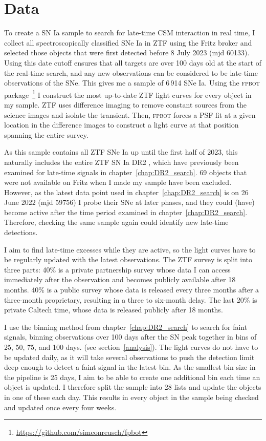\documentclass[a4paper,oneside,12pt, class=Latex/Classes/PhDthesisPSnPDF, crop=false]{standalone}
\begin{document}
\section{Data}
\label{data}
To create a SN Ia sample to search for late-time CSM interaction in real time, I collect all spectroscopically classified SNe Ia in ZTF using the Fritz broker \citep{skyportal2019, Skyportal} and selected those objects that were first detected before 8 July 2023 (mjd 60133). Using this date cutoff ensures that all targets are over 100 days old at the start of the real-time search, and any new observations can be considered to be late-time observations of the SNe. This gives me a sample of 6\,914 SNe Ia. Using the \textsc{fpbot} package \citep{fpbot}\,\footnote{\url{https://github.com/simeonreusch/fpbot}} I construct the most up-to-date ZTF light curves for every object in my sample. ZTF uses difference imaging to remove constant sources from the science images and isolate the transient. Then, \textsc{fpbot} forces a PSF fit at a given location in the difference images to construct a light curve at that position spanning the entire survey.

As this sample contains all ZTF SNe Ia up until the first half of 2023, this naturally includes the entire ZTF SN Ia DR2 \citep[][Smith et al., in prep.]{DR2_Overview}, which have previously been examined for late-time signals in chapter~\ref{chap:DR2_search}. 69 objects that were not available on Fritz when I made my sample have been excluded. However, as the latest data point used in chapter~\ref{chap:DR2_search} is on 26 June 2022 (mjd 59756) I probe their SNe at later phases, and they could (have) become active after the time period examined in chapter~\ref{chap:DR2_search}. Therefore, checking the same sample again could identify new late-time detections.

I aim to find late-time excesses while they are active, so the light curves have to be regularly updated with the latest observations. The ZTF survey is split into three parts: 40\% is a private partnership survey whose data I can access immediately after the observation and becomes publicly available after 18 months. 40\% is a public survey whose data is released every three months after a three-month proprietary, resulting in a three to six-month delay. The last 20\% is private Caltech time, whose data is released publicly after 18 months.

I use the binning method from chapter~\ref{chap:DR2_search} to search for faint signals, binning observations over 100 days after the SN peak together in bins of 25, 50, 75, and 100 days. (see section~\ref{analysis}). The light curves do not have to be updated daily, as it will take several observations to push the detection limit deep enough to detect a faint signal in the latest bin. As the smallest bin size in the pipeline is 25 days, I aim to be able to create one additional bin each time an object is updated. I therefore split the sample into 28 lists and update the objects in one of these each day. This results in every object in the sample being checked and updated once every four weeks.
\end{document}

